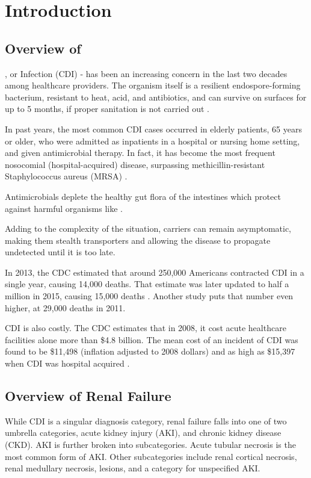 \chapter{Introduction}

\section{Overview of \cdifficile}

\cdifficile, or \cdiff Infection (CDI) -
has been an increasing concern in the last two decades among healthcare providers. 
The organism itself is a resilient endospore-forming bacterium, resistant to heat, acid, and antibiotics,
and can survive on surfaces for up to 5 months, if proper sanitation is not carried out \cite{Gerding2008}.

In past years, the most common CDI cases occurred in elderly patients, 65 years or older,
who were admitted as inpatients in a hospital or nursing home setting, and given antimicrobial therapy.
In fact, it has become the most frequent nosocomial (hospital-acquired) disease, surpassing
methicillin-resistant Staphylococcus aureus (MRSA) \cite{Gupta2014}.

Antimicrobials deplete the healthy gut flora of the intestines which protect against harmful organisms like \cdiff \cite{Lamont2017}.

Adding to the complexity of the situation, \cdiff carriers can remain asymptomatic, making them stealth transporters
and allowing the disease to propagate undetected until it is too late. 

In 2013, the CDC estimated that around 250,000 Americans contracted CDI in a single year, causing 14,000 deaths.
That estimate was later updated to half a million in 2015, causing 15,000 deaths \cite{CDC2015, CDC2018}.
Another study puts that number even higher, at 29,000 deaths in 2011. 

CDI is also costly. The CDC estimates that in 2008, it cost acute healthcare facilities alone more than \$4.8 billion.
The mean cost of an incident of CDI was found to be \$11,498 (inflation adjusted to 2008 dollars)
and as high as \$15,397 when CDI was hospital acquired \cite{Dubberke2012}.


\section{Overview of Renal Failure}

While CDI is a singular diagnosis category, renal failure falls into one of two umbrella categories, acute kidney injury (AKI), 
and chronic kidney disease (CKD). AKI is further broken into subcategories. Acute tubular necrosis is the most common form of AKI.
Other subcategories include renal cortical necrosis, renal medullary necrosis, lesions, and a category for unspecified AKI. 


